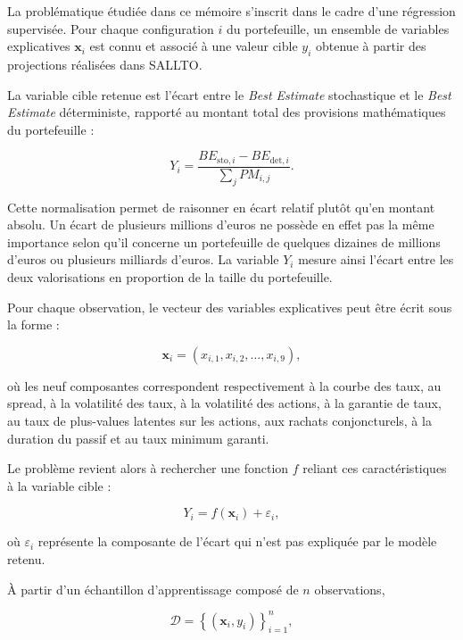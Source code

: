 La problématique étudiée dans ce mémoire s'inscrit dans le cadre d'une régression supervisée. Pour chaque configuration $i$ du portefeuille, un ensemble de variables explicatives $\mathbf{x}_i$ est connu et associé à une valeur cible $y_i$ obtenue à partir des projections réalisées dans SALLTO.

La variable cible retenue est l'écart entre le \textit{Best Estimate} stochastique et le \textit{Best Estimate} déterministe, rapporté au montant total des provisions mathématiques du portefeuille :

\begin{equation}
    Y_i =
    \frac{
        BE_{\mathrm{sto},i} - BE_{\mathrm{det},i}
    }{
        \sum_j PM_{i,j}
    }.
    \label{eq:target_ml}
\end{equation}

Cette normalisation permet de raisonner en écart relatif plutôt qu'en montant absolu. Un écart de plusieurs millions d'euros ne possède en effet pas la même importance selon qu'il concerne un portefeuille de quelques dizaines de millions d'euros ou plusieurs milliards d'euros. La variable $Y_i$ mesure ainsi l'écart entre les deux valorisations en proportion de la taille du portefeuille.

Pour chaque observation, le vecteur des variables explicatives peut être écrit sous la forme :

\begin{equation}
\mathbf{x}_i =
\left(
x_{i,1},
x_{i,2},
\ldots,
x_{i,9}
\right),
\end{equation}

où les neuf composantes correspondent respectivement à la courbe des taux, au spread, à la volatilité des taux, à la volatilité des actions, à la garantie de taux, au taux de plus-values latentes sur les actions, aux rachats conjoncturels, à la duration du passif et au taux minimum garanti.

Le problème revient alors à rechercher une fonction $f$ reliant ces caractéristiques à la variable cible :

\begin{equation}
    Y_i = f(\mathbf{x}_i) + \varepsilon_i,
\end{equation}

où $\varepsilon_i$ représente la composante de l'écart qui n'est pas expliquée par le modèle retenu.

À partir d'un échantillon d'apprentissage composé de $n$ observations,

\begin{equation}
    \mathcal{D}
    =
    \left\{
    \left(\mathbf{x}_i,y_i\right)
    \right\}_{i=1}^{n},
\end{equation}

